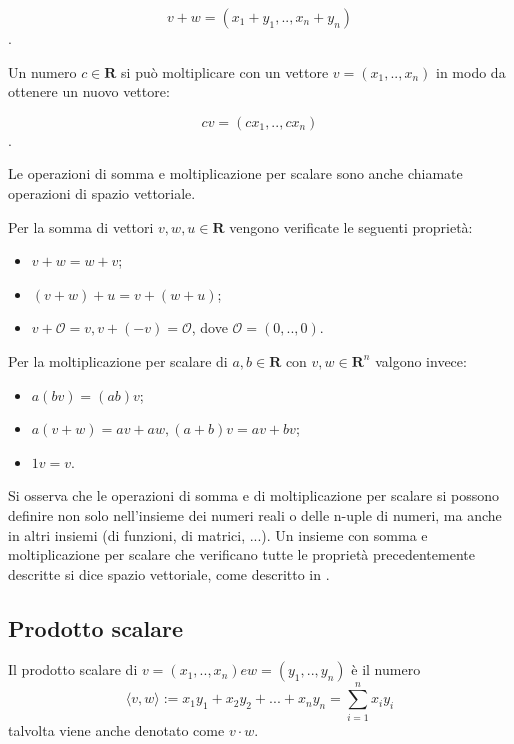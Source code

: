 	$$v + w = (x_1 + y_1, .., x_n + y_n)$$.

Un numero $c \in \mathbf{R}$ si può moltiplicare con un vettore $v = (x_1, .., x_n)$ in modo da ottenere un nuovo vettore:

	$$cv = (cx_1, .., cx_n)$$.

Le operazioni di somma e moltiplicazione per scalare sono anche chiamate operazioni di spazio vettoriale. 

Per la somma di vettori $v, w, u \in \mathbf{R}$ vengono verificate le seguenti proprietà:
\vspace{10pt}
\begin{itemize}
	\item $v + w = w + v$;
	\vspace{5pt}
	\item $(v + w) + u = v + (w + u)$;
	\vspace{5pt}
	\item $v + \mathcal{O} = v, v + (-v) = \mathcal{O}$, dove $\mathcal{O} = (0, .., 0)$.
\end{itemize}

Per la moltiplicazione per scalare di $a, b \in \mathbf{R}$ con $v, w \in \mathbf{R}^n$ valgono invece: 
\vspace{10pt}
\begin{itemize}
	\item $a(bv) = (ab)v$;
	\vspace{5pt}
	\item $a(v + w) = av + aw, (a + b)v = av + bv$;
	\vspace{5pt}
	\item $1v = v$.
\end{itemize}
Si osserva che le operazioni di somma e di moltiplicazione per scalare si possono definire non solo nell'insieme dei numeri reali o delle n-uple di numeri, ma anche in altri insiemi (di funzioni, di matrici, ...). Un insieme con somma e moltiplicazione per scalare che verificano tutte le proprietà precedentemente descritte si dice spazio vettoriale, come descritto in \cite{Algebra}.

\subsection{Prodotto scalare}\label{subsec:prodotto_scalare}
Il prodotto scalare di $v = (x_1, .., x_n) e w = (y_1, .., y_n)$ è il numero
	$$\langle v,w \rangle := x_1y_1 + x_2y_2 + ... + x_ny_n = \sum_{i=1}^{n} x_iy_i$$
talvolta viene anche denotato come $v \cdot w$. 

